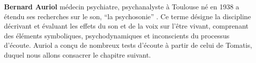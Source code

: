 
    \textbf{Bernard Auriol} médecin psychiatre,
   psychanalyste à Toulouse né en 1938
a étendu ses recherches sur le son, %
\enquote {la psychosonie} \autocite{auriol_stress}. Ce terme
désigne la discipline décrivant et évaluant les effets du
son et de la voix sur l'être vivant, comprenant des éléments
symboliques, psychodynamiques et inconscients du processus
d'écoute. Auriol a conçu de nombreux tests d'écoute à partir de celui de Tomatis, duquel nous allons consacrer le chapitre suivant.
